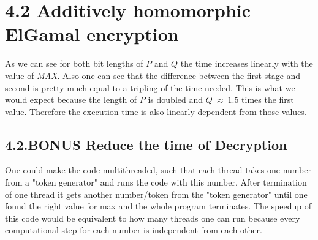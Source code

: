 \documentclass{article}
\begin{document}
	\pagestyle{fancy}
	\hfill
	
	\section*{4.2 Additively homomorphic ElGamal encryption}
	\begin{adjustwidth}{2em}{2em}
		
		\begin{figure}[h!]
		\end{figure}
		\noindent As we can see for both bit lengths of $P$ and $Q$ the time increases linearly with the value of \textit{MAX}. Also one can see that the difference between the first stage and second is pretty much equal to a tripling of the time needed. This is what we would expect because the length of $P$ is doubled and $Q \ \approx \ 1.5$ times the first value. Therefore the execution time is also  linearly dependent from those values.
		\subsection*{4.2.BONUS Reduce the time of Decryption}
		\begin{adjustwidth}{2em}{}
			One could make the code multithreaded, such that each thread takes one number from a "token generator" and runs the code with this number. After termination of one thread it gets another number/token from the "token generator" until one found the right value for max and the whole program terminates. The speedup of this code would be equivalent to how many threads one can run because every computational step for each number is independent from each other.
		\end{adjustwidth}
	\end{adjustwidth}
\end{document}
